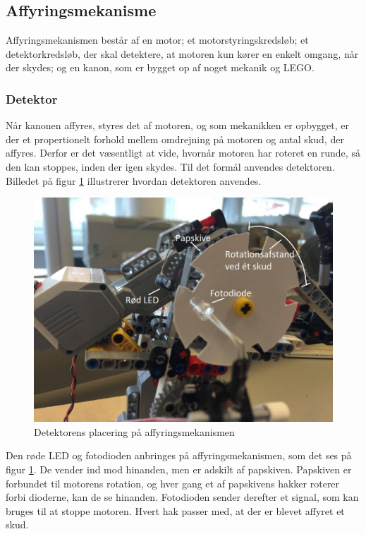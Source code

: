\subsection{Affyringsmekanisme}
Affyringsmekanismen består af en motor; et motorstyringskredsløb; et detektorkredsløb, der skal detektere, at motoren kun kører en enkelt omgang, når der skydes; og en kanon, som er bygget op af noget mekanik og LEGO. 

\subsubsection{Detektor}
Når kanonen affyres, styres det af motoren, og som mekanikken er opbygget, er der et propertionelt forhold mellem omdrejning på motoren og antal skud, der affyres. Derfor er det væsentligt at vide, hvornår motoren har roteret en runde, så den kan stoppes, inden der igen skydes. Til det formål anvendes detektoren. Billedet på figur \ref{fig:detektor} illustrerer hvordan detektoren anvendes.

\begin{figure}[H]
	\centering
	\includegraphics[width=\textwidth]{Afsnit/DesignOgImplementering/images/detektor}
	\caption{Detektorens placering på affyringsmekanismen}
	\label{fig:detektor}
\end{figure}

Den røde LED og fotodioden anbringes på affyringsmekanismen, som det ses på figur \ref{fig:detektor}. De vender ind mod hinanden, men er adskilt af papskiven. Papskiven er forbundet til motorens rotation, og hver gang et af papskivens hakker roterer forbi dioderne, kan de se hinanden. Fotodioden sender derefter et signal, som kan bruges til at stoppe motoren. Hvert hak passer med, at der er blevet affyret et skud.  

